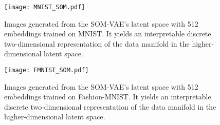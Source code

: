 


\begin{figure}[h]
    \centering
    \texttt{[image: MNIST\_SOM.pdf]}
    \caption{Images generated from the SOM-VAE's latent space with 512 embeddings trained on MNIST. It yields an interpretable discrete two-dimensional representation of the data manifold in the higher-dimensional latent space.}
    \label{fig:MNIST_SOM}
\end{figure}

\begin{figure}[h]
    \centering
    \texttt{[image: FMNIST\_SOM.pdf]}
    \caption{Images generated from the SOM-VAE's latent space with 512 embeddings trained on Fashion-MNIST. It yields an interpretable discrete two-dimensional representation of the data manifold in the higher-dimensional latent space.}
    \label{fig:FMNIST_SOM}
\end{figure}




